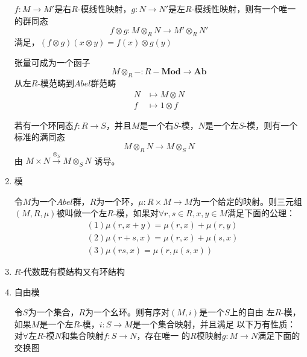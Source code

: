 \documentclass{ctexart}
\begin{document}
\begin{enumerate}
$f : M \to M'$是右$R$-模线性映射，$g : N \to N'$是左$R$-模线性映射，则有一个唯一的群同态
\[
f \otimes g : M \otimes_R N \to M' \otimes_R N'
\]
满足，$(f \otimes g)(x \otimes y) = f(x) \otimes g(y)$
\begin{center}
\end{center}

张量可成为一个函子
\[
M \otimes_R - : R\!\!-\!\!\mathbf{Mod} \to \mathbf{Ab}
\]
从左$R$-模范畴到$Abel$群范畴
\begin{align*}
N &\mapsto M \otimes N \\
f &\mapsto 1 \otimes f
\end{align*}

若有一个环同态$f : R \to S$，并且$M$是一个右$S$-模，$N$是一个左$S$-模，则有一个标准的满同态
\[
M \otimes_R N \to M \otimes_S N
\]
由 $M \times N \overset{\otimes_S}{\to} M \otimes_S N$ 诱导。
\begin{center}
\end{center}

\item 模

令$M$为一个$Abel$群，$R$为一个环，$\mu : R \times M \to M$为一个给定的映射。则三元组$(M, R, \mu)$被叫做一个左$R$-模，如果对$\forall r,s \in R, x,y \in M$满足下面的公理：
\begin{align*}
&(1) \mu(r, x + y) = \mu(r, x) + \mu(r, y)\\
&(2) \mu(r + s, x) = \mu(r, x) + \mu(s, x)\\
&(3) \mu(rs, x) = \mu(r, \mu(s, x))
\end{align*}

\item $R$-代数既有模结构又有环结构

\item 自由模

令$S$为一个集合，$R$为一个幺环。则有序对$(M, i)$是一个$S$上的自由
左$R$-模，如果$M$是一个左$R$-模，$i : S \to M$是一个集合映射，并且满足
以下万有性质：对$\forall$左$R$-模$N$和集合映射$f : S \to N$，存在唯一
的$R$模映射$g : M \to N$满足下面的交换图
\begin{center}
\end{center}


\end{enumerate}
\end{document}
